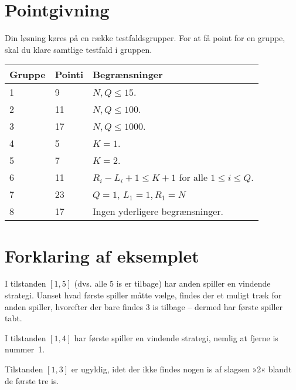 \section*{Pointgivning}

Din løsning køres på en række testfaldsgrupper.
For at få point for en gruppe, skal du klare samtlige testfald i gruppen.

\noindent
\begin{tabular}{| l | l | l |}
\hline
Gruppe & Pointi    & Begrænsninger \\ \hline
1     & 9          &  $N,Q \le 15$.\\ \hline
2     & 11         &  $N,Q \le 100$. \\ \hline
3     & 17         &  $N,Q \le 1000$. \\ \hline
4     & 5          &  $K=1$. \\ \hline
5     & 7          &  $K=2$. \\ \hline
6     & 11         &  $R_i - L_i + 1 \le K+1$ for alle $1 \le i \le Q$. \\ \hline
7     & 23         &  $Q=1$, $L_1=1, R_1=N$ \\ \hline
8     & 17         &  Ingen yderligere begrænsninger. \\ \hline
\end{tabular}

\section*{Forklaring af eksemplet}

I tilstanden $[1,5]$ (dvs. alle $5$ is er tilbage) har anden spiller en vindende strategi.
Uanset hvad første spiller måtte vælge, findes der et muligt træk for anden spiller, hvorefter der bare findes $3$ is tilbage -- dermed har  første spiller tabt.

I tilstanden $[1,4]$ har første spiller  en vindende strategi, nemlig at fjerne is nummer~1.

Tilstanden $[1,3]$ er ugyldig, idet der ikke findes nogen is af slagsen »2« blandt de første tre is.

